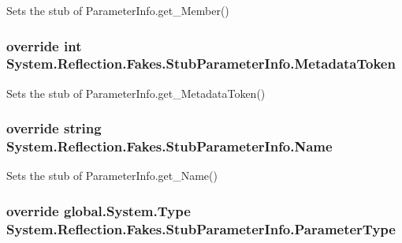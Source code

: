 Sets the stub of Parameter\-Info.\-get\-\_\-\-Member()

\hypertarget{class_system_1_1_reflection_1_1_fakes_1_1_stub_parameter_info_ad8cd97a3c1ed88ac99cbf5083d34aee6}{
\subsubsection[{Metadata\-Token}]{\setlength{\rightskip}{0pt plus 5cm}override int System.\-Reflection.\-Fakes.\-Stub\-Parameter\-Info.\-Metadata\-Token\hspace{0.3cm}{\ttfamily [get]}}}\label{class_system_1_1_reflection_1_1_fakes_1_1_stub_parameter_info_ad8cd97a3c1ed88ac99cbf5083d34aee6}


Sets the stub of Parameter\-Info.\-get\-\_\-\-Metadata\-Token()

\hypertarget{class_system_1_1_reflection_1_1_fakes_1_1_stub_parameter_info_a3844f326f3e60e9ee7851630417f0288}{
\subsubsection[{Name}]{\setlength{\rightskip}{0pt plus 5cm}override string System.\-Reflection.\-Fakes.\-Stub\-Parameter\-Info.\-Name\hspace{0.3cm}{\ttfamily [get]}}}\label{class_system_1_1_reflection_1_1_fakes_1_1_stub_parameter_info_a3844f326f3e60e9ee7851630417f0288}


Sets the stub of Parameter\-Info.\-get\-\_\-\-Name()

\hypertarget{class_system_1_1_reflection_1_1_fakes_1_1_stub_parameter_info_aaeb1430f47a634e4d092e25d3e373da9}{
\subsubsection[{Parameter\-Type}]{\setlength{\rightskip}{0pt plus 5cm}override global.\-System.\-Type System.\-Reflection.\-Fakes.\-Stub\-Parameter\-Info.\-Parameter\-Type\hspace{0.3cm}{\ttfamily [get]}}}\label{class_system_1_1_reflection_1_1_fakes_1_1_stub_parameter_info_aaeb1430f47a634e4d092e25d3e373da9}


